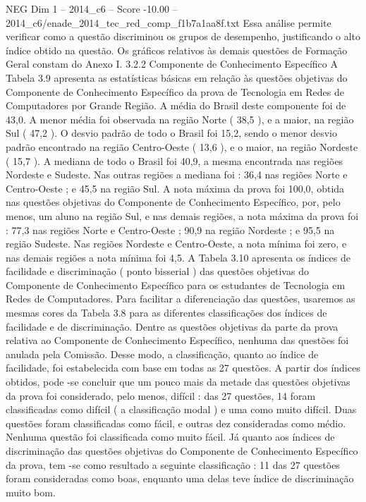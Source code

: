\begin{textsample}{NEG Dim 1 – 2014\_c6 – Score -10.00 – 2014\_c6/enade\_2014\_tec\_red\_comp\_f1b7a1aa8f.txt}
Essa análise permite verificar como a questão discriminou os grupos de desempenho, justificando o alto índice obtido na questão.
Os gráficos relativos às demais questões de Formação Geral constam do Anexo I. 3.2.2 Componente de Conhecimento Específico A Tabela 3.9 apresenta as estatísticas básicas em relação às questões objetivas do Componente de Conhecimento Específico da prova de Tecnologia em Redes de Computadores por Grande Região.
A média do Brasil deste componente foi de 43,0.
A menor média foi observada na região Norte ( 38,5 ), e a maior, na região Sul ( 47,2 ).
O desvio padrão de todo o Brasil foi 15,2, sendo o menor desvio padrão encontrado na região Centro-Oeste ( 13,6 ), e o maior, na região Nordeste ( 15,7 ).
A mediana de todo o Brasil foi 40,9, a mesma encontrada nas regiões Nordeste e Sudeste.
Nas outras regiões a mediana foi : 36,4 nas regiões Norte e Centro-Oeste ; e 45,5 na região Sul.
A nota máxima da prova foi 100,0, obtida nas questões objetivas do Componente de Conhecimento Específico, por, pelo menos, um aluno na região Sul, e nas demais regiões, a nota máxima da prova foi : 77,3 nas regiões Norte e Centro-Oeste ; 90,9 na região Nordeste ; e 95,5 na região Sudeste.
Nas regiões Nordeste e Centro-Oeste, a nota mínima foi zero, e nas demais regiões a nota mínima foi 4,5.
A Tabela 3.10 apresenta os índices de facilidade e discriminação ( ponto bisserial ) das questões objetivas do Componente de Conhecimento Específico para os estudantes de Tecnologia em Redes de Computadores.
Para facilitar a diferenciação das questões, usaremos as mesmas cores da Tabela 3.8 para as diferentes classificações dos índices de facilidade e de discriminação.
Dentre as questões objetivas da parte da prova relativa ao Componente de Conhecimento Específico, nenhuma das questões foi anulada pela Comissão.
Desse modo, a classificação, quanto ao índice de facilidade, foi estabelecida com base em todas as 27 questões.
A partir dos índices obtidos, pode -se concluir que um pouco mais da metade das questões objetivas da prova foi considerado, pelo menos, difícil : das 27 questões, 14 foram classificadas como difícil ( a classificação modal ) e uma como muito difícil.
Duas questões foram classificadas como fácil, e outras dez consideradas como médio.
Nenhuma questão foi classificada como muito fácil.
Já quanto aos índices de discriminação das questões objetivas do Componente de Conhecimento Específico da prova, tem -se como resultado a seguinte classificação : 11 das 27 questões foram consideradas como boas, enquanto uma delas teve índice de discriminação muito bom.

\end{textsample}
